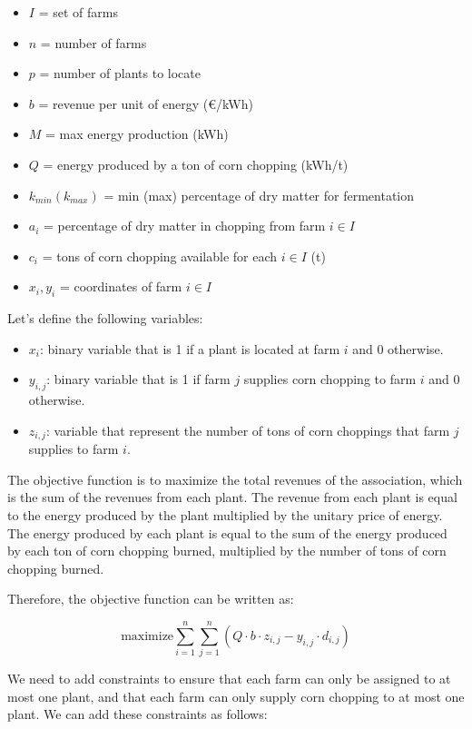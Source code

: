 \documentclass{article}
\begin{document}
\begin{itemize}
    \item $I$ = set of farms
    \item $n$ = number of farms
    \item $p$ = number of plants to locate
    \item $b$ = revenue per unit of energy (€/kWh)
    \item $M$ = max energy production (kWh)
    \item $Q$ = energy produced by a ton of corn chopping (kWh/t)
    \item $k_{min} (k_{max})$ = min (max) percentage of dry matter for fermentation
    \item $a_i$ = percentage of dry matter in chopping from farm $i \in I$
    \item $c_i$ = tons of corn chopping available for each $i \in I$ (t)
    \item $x_i, y_i$ = coordinates of farm $i \in I$
\end{itemize}

Let's define the following variables:
\begin{itemize}
    \item $x_i$: binary variable that is 1 if a plant is located at farm $i$ and 0 otherwise.
    \item  $y_{i,j}$: binary variable that is 1 if farm $j$ supplies corn chopping to farm $i$ and 0 otherwise.
    \item  $z_{i,j}$: variable that represent the number of tons of corn choppings that farm $j$ supplies to farm $i$.

\end{itemize}

The objective function is to maximize the total revenues of the association, which is the sum of the revenues from each plant. The revenue from each plant is equal to the energy produced by the plant multiplied by the unitary price of energy. The energy produced by each plant is equal to the sum of the energy produced by each ton of corn chopping burned, multiplied by the number of tons of corn chopping burned.

Therefore, the objective function can be written as:

$$\text{maximize} \sum_{i=1}^n \sum_{j=1}^n (Q \cdot b \cdot z_{i,j} - y_{i,j} \cdot d_{i,j})$$

We need to add constraints to ensure that each farm can 
only be assigned to at most one plant, and that each farm can only supply corn chopping to at most one plant. 
We can add these constraints as follows:
\end{document}
